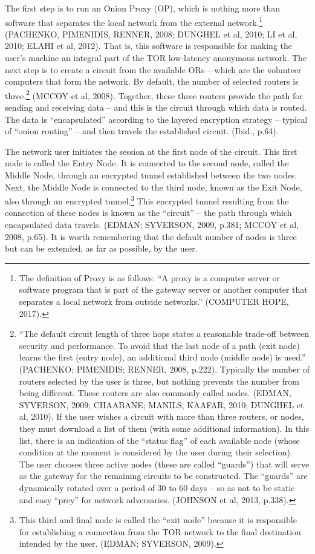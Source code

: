 The first step is to run an Onion Proxy (OP), which is nothing more than software that separates the local network from the external network.\footnote{The definition of Proxy is as follows: ``A proxy is a computer server or software program that is part of the gateway server or another computer that separates a local network from outside networks.'' (COMPUTER HOPE, 2017).} (PACHENKO, PIMENIDIS, RENNER, 2008; DUNGHEL et al, 2010; LI et al, 2010; ELAHI et al, 2012). That is, this software is responsible for making the user's machine an integral part of the TOR low-latency anonymous network. The next step is to create a circuit from the available ORs -- which are the volunteer computers that form the network. By default, the number of selected routers is three.\footnote{``The default circuit length of three hops states a reasonable trade-off between security and performance. To avoid that the last node of a path (exit node) learns the first (entry node), an additional third node (middle node) is used.'' (PACHENKO; PIMENIDIS; RENNER, 2008, p.222). Typically the number of routers selected by the user is three, but nothing prevents the number from being different. These routers are also commonly called nodes. (EDMAN, SYVERSON, 2009; CHAABANE; MANILS, KAAFAR, 2010; DUNGHEL et al, 2010). If the user wishes a circuit with more than three routers, or nodes, they must download a list of them (with some additional information). In this list, there is an indication of the ``status flag'' of each available node (whose condition at the moment is considered by the user during their selection). The user chooses three active nodes (these are called ``guards'') that will serve as the gateway for the remaining circuits to be constructed. The ``guards'' are dynamically rotated over a period of 30 to 60 days -- so as not to be static and easy ``prey'' for network adversaries. (JOHNSON et al, 2013, p.338).} (MCCOY et al, 2008). Together, these three routers provide the path for sending and receiving data -- and this is the circuit through which data is routed. The data is ``encapsulated'' according to the layered encryption strategy -- typical of ``onion routing'' -- and then travels the established circuit. (Ibid., p.64).

The network user initiates the session at the first node of the circuit. This first node is called the Entry Node. It is connected to the second node, called the Middle Node, through an encrypted tunnel established between the two nodes. Next, the Middle Node is connected to the third node, known as the Exit Node, also through an encrypted tunnel.\footnote{This third and final node is called the ``exit node'' because it is responsible for establishing a connection from the TOR network to the final destination intended by the user. (EDMAN; SYVERSON, 2009).} This encrypted tunnel resulting from the connection of these nodes is known as the ``circuit'' -- the path through which encapsulated data travels. (EDMAN; SYVERSON, 2009, p.381; MCCOY et al, 2008, p.65). It is worth remembering that the default number of nodes is three but can be extended, as far as possible, by the user.

